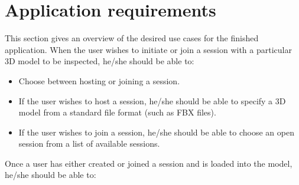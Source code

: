 \documentclass[UKenglish]{ifimaster}
\begin{document}
\section{Application requirements}
This section gives an overview of the desired use cases for the finished application. When the user
wishes to initiate or join a session with a particular 3D model to be inspected, he/she should be able to:
\begin{itemize}
	\item Choose between hosting or joining a session.
	\item If the user wishes to host a session, he/she should be able to specify a 3D model from a standard file format (such as FBX files).
	\item If the user wishes to join a session, he/she should be able to choose an open session from a list of available sessions.
\end{itemize}
Once a user has either created or joined a session and is loaded into the model, he/she should be able to:
\end{document}
